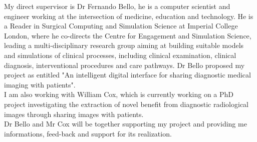 My direct supervisor is Dr Fernando Bello, he is a computer scientist and engineer working at the intersection of medicine, education and technology. He is a Reader in Surgical Computing and Simulation Science at Imperial College London, where he co-directs the Centre for Engagement and Simulation Science, leading a multi-disciplinary research group aiming at building suitable models and simulations of clinical processes, including clinical examination, clinical diagnosis, interventional procedures and care pathways.
Dr Bello proposed my project as entitled "An intelligent digital interface for sharing diagnostic medical imaging with patients".\\

I am also working with William Cox, which is currently working on a PhD project investigating the extraction of novel benefit from diagnostic radiological images through sharing images with patients.\\ 

Dr Bello and Mr Cox will be together supporting my project and providing me informations, feed-back and support for its realization. \\
